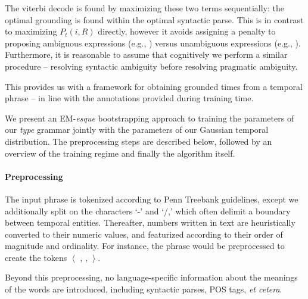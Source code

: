 The viterbi decode is found by maximizing these two terms sequentially:
	the optimal grounding is found within the optimal syntactic parse.
This is in contrast to maximizing $P_t(i,R)$ directly, however it avoids
	assigning a penalty to proposing ambiguous expressions (e.g., )
	versus unambiguous expressions (e.g., ).
Furthermore, it is reasonable to assume that cognitively we perform a
	similar procedure -- resolving syntactic ambiguity before resolving
	pragmatic ambiguity.

This provides us with a framework for obtaining grounded times from a
	temporal phrase -- in line with the annotations provided during training
	time.


We present an EM-\textit{esque} bootstrapping approach to training the 
	parameters of our \textit{type} grammar jointly with the parameters of our 
	Gaussian temporal distribution.
The preprocessing steps are described below, followed by an overview
	of the training regime and finally the algorithm itself.

\paragraph{Preprocessing}
The input phrase is tokenized according to Penn Treebank guidelines,
	except we additionally split on the characters `-' and `/,' which
	often delimit a boundary between temporal entities.
Thereafter, numbers written in text are heuristically converted to their
	numeric values, and featurized according to their order of magnitude
	and ordinality.
For instance, the phrase  would be preprocessed to create the
	tokens $\left<\right.$  , \tp{-} ,  
		$\left.\right>$.

Beyond this preprocessing, no language-specific information about the meanings
	of the words are introduced, including syntactic parses, POS tags,
	\textit{et cetera}.


